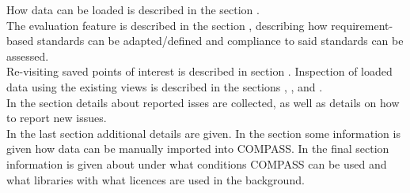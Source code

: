 How data can be loaded is described in the section . \\

The evaluation feature is described in the section , describing how requirement-based standards can be adapted/defined and compliance to said standards can be assessed. \\

Re-visiting saved points of interest is described in section . Inspection of loaded data using the existing views is described in the sections , ,  and . \\

In the section  details about reported isses are collected, as well as details on how to report new issues. \\

In the last section  additional details are given. In the section  some information is given how data can be manually imported into COMPASS. In the final section  information is given about under what conditions COMPASS can be used and what 
libraries with what licences are used in the background.

\pagebreak



%








